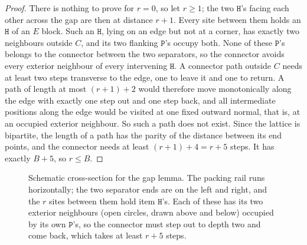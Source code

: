 \documentclass[11pt,letterpaper]{article}
\theoremstyle{definition}
\theoremstyle{remark}
\newcommand{\Hh}{\mathtt{H}}
\newcommand{\Pp}{\mathtt{P}}
\begin{document}
\begin{proof}
There is nothing to prove for $r=0$, so let $r\ge1$; the two $\Hh$'s facing each other across the
gap are then at distance $r+1$. Every site between them holds an $\Hh$ of an $E$ block. Such an $\Hh$,
lying on an edge but not at a corner, has exactly two neighbours outside $C$, and its two flanking
$\Pp$'s occupy both. None of these $\Pp$'s belongs to the connector between the two separators, so the
connector avoids every exterior neighbour of every intervening $\Hh$. A connector path outside $C$
needs at least two steps transverse to the edge, one to leave it and one to return. A path of length
at most $(r+1)+2$ would therefore move monotonically along the edge with exactly one step out and one
step back, and all intermediate positions along the edge would be visited at one fixed outward
normal, that is, at an occupied exterior neighbour. So such a path does not exist. Since the lattice
is bipartite, the length of a path has the parity of the distance between its end points, and the
connector needs at least $(r+1)+4=r+5$ steps. It has exactly $B+5$, so $r\le B$.
\end{proof}

\begin{figure}[ht]
\centering
{}
\caption{Schematic cross-section for the gap lemma. The packing rail runs horizontally; the two
separator ends are on the left and right, and the $r$ sites between them hold item $\Hh$'s. Each of
these has its two exterior neighbours (open circles, drawn above and below) occupied by its own
$\Pp$'s, so the connector must step out to depth two and come back, which takes at least $r+5$
steps.}
\label{fig:gap}
\end{figure}
\end{document}
